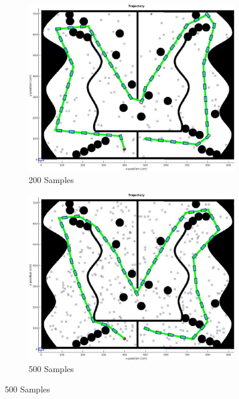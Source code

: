 \documentclass{article}
\begin{document}
\begin{figure}[H]
	\centering
	\begin{subfigure}[b]{0.49\linewidth}
		\centering
		\includegraphics[width=\textwidth]{images/prm_200.jpg}
		\caption{200 Samples}
	\end{subfigure}
	\begin{subfigure}[b]{0.49\linewidth}
		\centering
		\includegraphics[width=\textwidth]{images/prm_500.jpg}
		\caption{500 Samples}
	\end{subfigure}
	

\end{figure}
\end{document}
